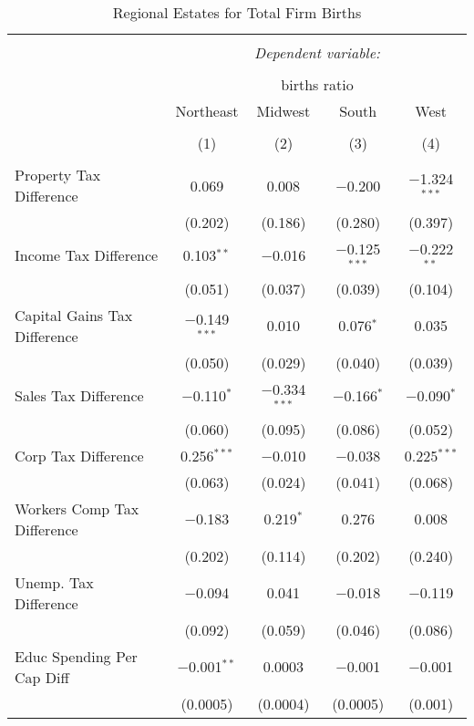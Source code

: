 
\begin{table}[!htbp] \centering 
  \caption{Regional Estates for  Total Firm Births} 
  \label{} 
\begin{tabular}{@{\extracolsep{5pt}}lcccc} 
\\[-1.8ex]\hline 
\hline \\[-1.8ex] 
 & \multicolumn{4}{c}{\textit{Dependent variable:}} \\ 
\cline{2-5} 
\\[-1.8ex] & \multicolumn{4}{c}{births ratio} \\ 
 & Northeast & Midwest & South & West \\ 
\\[-1.8ex] & (1) & (2) & (3) & (4)\\ 
\hline \\[-1.8ex] 
 Property Tax Difference & 0.069 & 0.008 & $-$0.200 & $-$1.324$^{***}$ \\ 
  & (0.202) & (0.186) & (0.280) & (0.397) \\ 
  Income Tax Difference & 0.103$^{**}$ & $-$0.016 & $-$0.125$^{***}$ & $-$0.222$^{**}$ \\ 
  & (0.051) & (0.037) & (0.039) & (0.104) \\ 
  Capital Gains Tax Difference & $-$0.149$^{***}$ & 0.010 & 0.076$^{*}$ & 0.035 \\ 
  & (0.050) & (0.029) & (0.040) & (0.039) \\ 
  Sales Tax Difference & $-$0.110$^{*}$ & $-$0.334$^{***}$ & $-$0.166$^{*}$ & $-$0.090$^{*}$ \\ 
  & (0.060) & (0.095) & (0.086) & (0.052) \\ 
  Corp Tax Difference & 0.256$^{***}$ & $-$0.010 & $-$0.038 & 0.225$^{***}$ \\ 
  & (0.063) & (0.024) & (0.041) & (0.068) \\ 
  Workers Comp Tax Difference & $-$0.183 & 0.219$^{*}$ & 0.276 & 0.008 \\ 
  & (0.202) & (0.114) & (0.202) & (0.240) \\ 
  Unemp. Tax Difference & $-$0.094 & 0.041 & $-$0.018 & $-$0.119 \\ 
  & (0.092) & (0.059) & (0.046) & (0.086) \\ 
  Educ Spending Per Cap Diff & $-$0.001$^{**}$ & 0.0003 & $-$0.001 & $-$0.001 \\ 
  & (0.0005) & (0.0004) & (0.0005) & (0.001) \\ 

\end{tabular}
\end{table}
